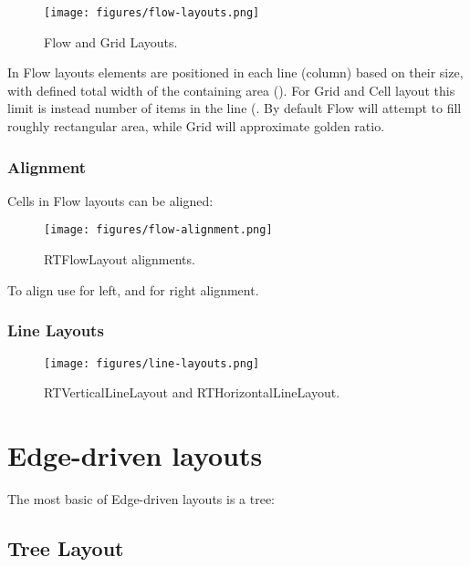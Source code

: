 \documentclass[a4paper,10pt,twoside]{book}
\begin{document}
\begin{figure}

\begin{center}
\texttt{[image: figures/flow-layouts.png]}\caption{Flow and Grid Layouts.\label{flow-layouts}}\end{center}
\end{figure}


In Flow layouts elements are positioned in each line (column) based on their size, with defined total width of the containing area (). For Grid and Cell layout this limit is instead number of items in the line (.
By default Flow will attempt to fill roughly rectangular area, while Grid will approximate golden ratio.
\subsubsection{ Alignment}
Cells in Flow layouts can be aligned:


\begin{figure}

\begin{center}
\texttt{[image: figures/flow-alignment.png]}\caption{RTFlowLayout alignments.\label{flow-alignment}}\end{center}
\end{figure}


To align  use  for left, and  for right alignment.
\subsubsection{ Line Layouts}

\begin{figure}

\begin{center}
\texttt{[image: figures/line-layouts.png]}\caption{RTVerticalLineLayout and RTHorizontalLineLayout.\label{line-layouts}}\end{center}
\end{figure}

\section{ Edge-driven layouts}
The most basic of Edge-driven layouts is a tree:
\subsection{ Tree Layout}
\end{document}
